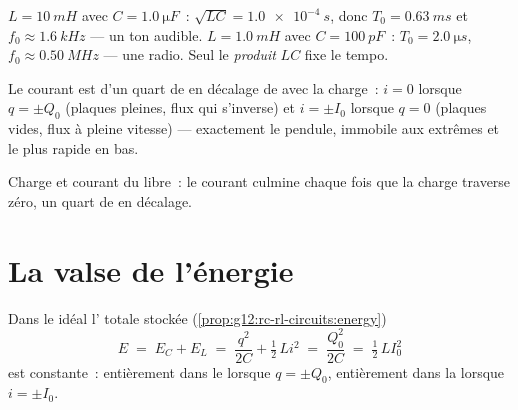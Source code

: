 \begin{example}\label{ex:g12:rlc-oscillations:firstnumbers}
$L = \qty{10}{mH}$ avec $C = \qty{1.0}{\micro F}$~:
$\sqrt{LC} = \qty{1.0e-4}{s}$, donc $T_0 = \qty{0.63}{ms}$ et
$f_0 \approx \qty{1.6}{kHz}$ --- un ton audible. $L = \qty{1.0}{mH}$
avec $C = \qty{100}{pF}$~: $T_0 = \qty{2.0}{\micro s}$,
$f_0 \approx \qty{0.50}{MHz}$ --- une 
radio. Seul le \emph{produit} $LC$ fixe le tempo.
\end{example}

\begin{remark}\label{rem:g12:rlc-oscillations:quarter}
Le courant est d'un quart de  en décalage
de  avec la charge~: $i = 0$ lorsque
$q = \pm Q_0$ (plaques pleines, flux qui s'inverse) et $i = \pm I_0$
lorsque $q = 0$ (plaques vides, flux à pleine vitesse) --- exactement
le pendule, immobile aux extrêmes et le plus rapide en bas.
\end{remark}

\begin{omfigure}

{\small Charge et courant du  libre~: le
courant culmine chaque fois que la charge traverse zéro, un quart de
 en décalage.}
\end{omfigure}

\section{La valse de l'énergie}

\begin{proposition}\label{prop:g12:rlc-oscillations:energy}
Dans le  idéal l'
totale stockée (\cref{prop:g12:rc-rl-circuits:energy})
\[
E \;=\; E_C + E_L \;=\; \frac{q^2}{2C} + \tfrac12\,L i^2
\;=\; \frac{Q_0^2}{2C} \;=\; \tfrac12\,L I_0^2
\]
est constante~: entièrement dans le
 lorsque $q = \pm Q_0$, entièrement dans
la  lorsque $i = \pm I_0$.
\end{proposition}

